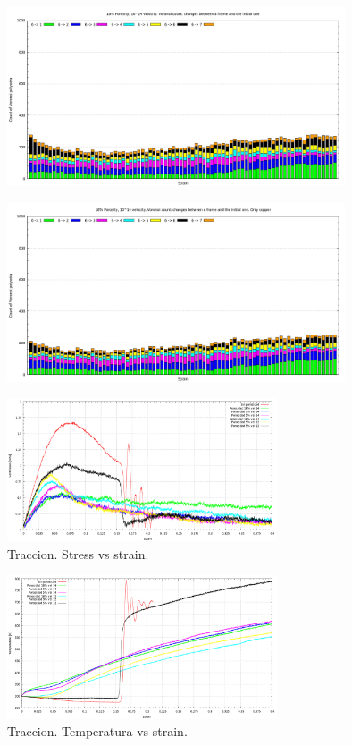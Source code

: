\documentclass[10pt, oneside]{article} %
\begin{document}
\begin{figure}[H]
\centering
\includegraphics[width=10cm]{Figures/Porosidad/Porosidad_2vel_comp_voronoi_hist16.png}
\caption{}
\end{figure}

\begin{figure}[H]
\centering
\includegraphics[width=10cm]{Figures/Porosidad/Porosidad_2vel_comp_voronoi_hist17.png}
\caption{}
\label{fg:26comp}
\end{figure}

\begin{figure}[H]
\centering
\includegraphics[width=8cm]{Figures/Porosidad/Porosidad_VM_strain_2vel_trac.png}
\caption{Traccion. Stress vs strain.}
\label{fg:1trac}
\end{figure}

\begin{figure}[H]
\centering
\includegraphics[width=8cm]{Figures/Porosidad/Porosidad_temp_strain_2vel_trac.png}
\caption{Traccion. Temperatura vs strain.}
\label{fg:2trac}
\end{figure}
\end{document}
